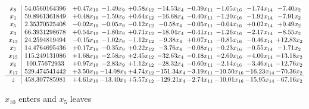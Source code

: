 \documentclass[9pt]{article}
\begin{document}
 \[\begin{array}{c| c c@{\hskip 2pt} c@{\hskip 2pt} c@{\hskip 2pt} c@{\hskip 2pt} c@{\hskip 2pt} c@{\hskip 2pt} c@{\hskip 2pt} c@{\hskip 2pt} }
 x_{8}   &  54.0560164396 & +  0.47 x_{10} & -1.49 x_{9} & +  0.58 x_{12} & -14.53 x_{4} & -0.39 x_{11} & -1.05 x_{16} & -1.74 x_{14} & -7.40 x_{2}\\
 x_{1}   &  59.8961361849 & +  0.48 x_{10} & -1.59 x_{9} & +  0.64 x_{12} & -16.68 x_{4} & -0.40 x_{11} & -1.20 x_{16} & -1.92 x_{14} & -7.91 x_{2}\\
 x_{5}   &  2.35370525408 & -0.02 x_{10} & -0.05 x_{9} & -0.12 x_{12} & -0.58 x_{4} & -0.05 x_{11} & -0.04 x_{16} & +  0.02 x_{14} & +  0.49 x_{2}\\
 x_{3}   &  66.3931298678 & +  0.54 x_{10} & -1.80 x_{9} & +  0.71 x_{12} & -18.04 x_{4} & -0.41 x_{11} & -1.26 x_{16} & -2.17 x_{14} & -8.55 x_{2}\\
 x_{13}   &  24.2594819494 & -0.15 x_{10} & -1.02 x_{9} & -1.12 x_{12} & -9.38 x_{4} & +  0.07 x_{11} & -0.85 x_{16} & -0.46 x_{14} & + 12.83 x_{2}\\
 x_{7}   &  14.4764695436 & +  0.17 x_{10} & -0.35 x_{9} & +  0.22 x_{12} & -3.76 x_{4} & -0.08 x_{11} & -0.23 x_{16} & -0.55 x_{14} & -1.71 x_{2}\\
 x_{15}   &  115.249131086 & +  1.68 x_{10} & -2.58 x_{9} & +  2.45 x_{12} & -32.63 x_{4} & -0.18 x_{11} & -2.60 x_{16} & -4.00 x_{14} & -13.18 x_{2}\\
 x_{6}   &  100.75672933 & +  0.97 x_{10} & -2.83 x_{9} & +  1.12 x_{12} & -28.32 x_{4} & -0.60 x_{11} & -2.14 x_{16} & -3.46 x_{14} & -12.76 x_{2}\\
 x_{17}   &  529.474541442 & +  3.50 x_{10} & -14.08 x_{9} & +  4.74 x_{12} & -151.34 x_{4} & -3.19 x_{11} & -10.50 x_{16} & -16.23 x_{14} & -70.36 x_{2}\\
\hline
z    &  458.307785981 & +  4.61 x_{10} & -13.40 x_{9} & +  5.57 x_{12} & -129.21 x_{4} & -2.74 x_{11} & -10.01 x_{16} & -15.95 x_{14} & -67.16 x_{2}\\
\end{array}\]


 $ x_{10} $ enters and $ x_{5} $ leaves 
\end{document}
